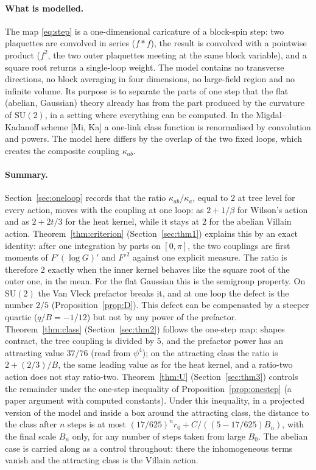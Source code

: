 \documentclass[11pt,a4paper]{article}
\theoremstyle{definition}
\theoremstyle{remark}
\newcommand{\SU}{\mathrm{SU}(2)}
\begin{document}
\paragraph{What is modelled.}
The map \eqref{eq:step} is a one-dimensional caricature of a block-spin step: two plaquettes are convolved in series ($f*f$), the result is convolved with a pointwise product ($f^2$, the two outer plaquettes meeting at the same block variable), and a square root returns a single-loop weight.
The model contains no transverse directions, no block averaging in four dimensions, no large-field region and no infinite volume.
Its purpose is to separate the parts of one step that the flat (abelian, Gaussian) theory already has from the part produced by the curvature of $\SU$, in a setting where everything can be computed.
In the Migdal--Kadanoff scheme [Mi, Ka] a one-link class function is renormalised by convolution and powers.
The model here differs by the overlap of the two fixed loops, which creates the composite coupling $\kappa_{ab}$.

\paragraph{Summary.}
Section~\ref{sec:oneloop} records that the ratio $\kappa_{ab}/\kappa_a$, equal to $2$ at tree level for every action, moves with the coupling at one loop: as $2+1/\beta$ for Wilson's action and as $2+2t/3$ for the heat kernel, while it stays at $2$ for the abelian Villain action.
Theorem~\ref{thm:criterion} (Section~\ref{sec:thm1}) explains this by an exact identity: after one integration by parts on $[0,\pi]$, the two couplings are first moments of $F'(\log G)'$ and $F'^2$ against one explicit measure.
The ratio is therefore $2$ exactly when the inner kernel behaves like the square root of the outer one, in the mean.
For the flat Gaussian this is the semigroup property.
On $\SU$ the Van Vleck prefactor breaks it, and at one loop the defect is the number $2/5$ (Proposition~\ref{prop:D}).
This defect can be compensated by a steeper quartic ($q/B=-1/12$) but not by any power of the prefactor.
Theorem~\ref{thm:class} (Section~\ref{sec:thm2}) follows the one-step map: shapes contract, the tree coupling is divided by $5$, and the prefactor power has an attracting value $37/76$ (read from $\psi^4$); on the attracting class the ratio is $2+(2/3)/B$, the same leading value as for the heat kernel, and a ratio-two action does not stay ratio-two.
Theorem~\ref{thm:U} (Section~\ref{sec:thm3}) controls the remainder under the one-step inequality of Proposition~\ref{prop:onestep} (a paper argument with computed constants).
Under this inequality, in a projected version of the model and inside a box around the attracting class, the distance to the class after $n$ steps is at most $(17/625)^nr_0+C/((5-17/625)B_n)$, with the final scale $B_n$ only, for any number of steps taken from large $B_0$.
The abelian case is carried along as a control throughout: there the inhomogeneous terms vanish and the attracting class is the Villain action.
\end{document}
